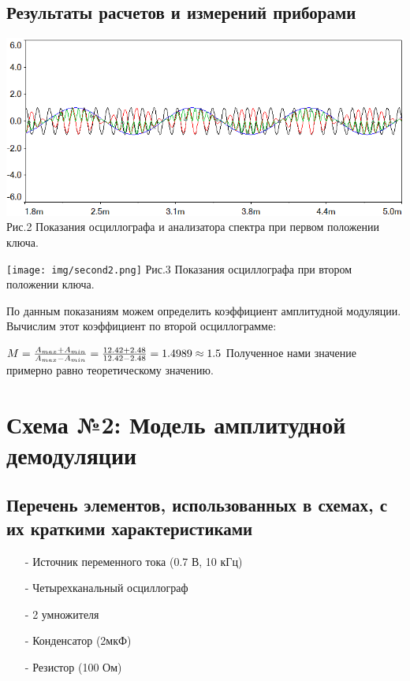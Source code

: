 \documentclass[11pt]{article}
\begin{document}
\subsection{Результаты расчетов и измерений приборами}
\begin{center}
    \includegraphics[width=1\linewidth]{img/second1.png}
        Рис.2 Показания осциллографа и анализатора спектра при первом положении ключа.
\end{center}

\begin{center}
    \texttt{[image: img/second2.png]}
        Рис.3 Показания осциллографа при втором положении ключа.
\end{center}

По данным показаниям можем определить коэффициент амплитудной модуляции. Вычислим этот коэффициент по второй осциллограмме:

$
M = \frac{{A_{max}+A_{min}}}{A_{max}-A_{min}} = \frac{{12.42+2.48}}{12.42-2.48}=1.4989\approx 1.5\\
$
Полученное нами значение примерно равно теоретическому значению.


\newpage
\section{Схема №2: Модель амплитудной демодуляции}
\subsection{Перечень элементов, использованных в схемах, с
их краткими характеристиками}
\begin{itemize}
    \item[-] Источник переменного тока (0.7 В, 10 кГц)
    \item[-] Четырехканальный осциллограф
    \item[-] 2 умножителя
    \item[-] Конденсатор (2мкФ)
    \item[-] Резистор (100 Ом)
\end{itemize}
\end{document}
